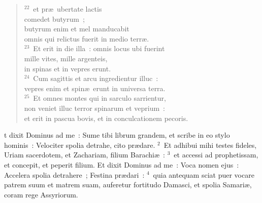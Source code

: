 \begin{verse}
${}^{22}$~et pr\ae\ ubertate lactis\\ comedet butyrum~;\\ butyrum enim et mel manducabit\\ omnis qui relictus fuerit in medio terr\ae .\\
${}^{23}$~Et erit in die illa~: omnis locus ubi fuerint\\ mille vites, mille argenteis,\\ in spinas et in vepres erunt.\\
${}^{24}$~Cum sagittis et arcu ingredientur illuc~:\\ vepres enim et spin\ae\ erunt in universa terra.\\
${}^{25}$~Et omnes montes qui in sarculo sarrientur,\\ non veniet illuc terror spinarum et veprium~:\\ et erit in pascua bovis, et in conculcationem pecoris.\end{verse}



\bchapter
{}t dixit Dominus ad me~: Sume tibi librum grandem, et scribe in eo stylo hominis~: Velociter spolia detrahe, cito pr\ae dare.
${}^{2}$~Et adhibui mihi testes fideles, Uriam sacerdotem, et Zachariam, filium Barachi\ae~:
${}^{3}$~et accessi ad prophetissam, et concepit, et peperit filium. Et dixit Dominus ad me~: Voca nomen ejus~: Accelera spolia detrahere~; Festina pr\ae dari~:
${}^{4}$~quia antequam sciat puer vocare patrem suum et matrem suam, auferetur fortitudo Damasci, et spolia Samari\ae , coram rege Assyriorum.


